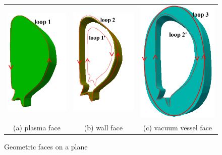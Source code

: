 \documentclass[11pt]{article}  %
\begin{document}
\begin{figure}
\center
\begin{tabular}{ccc}
\includegraphics[scale=0.3]{fig/plasmaGeoRegion.png}&
\includegraphics[scale=0.3]{fig/wallGeoRegion.png}&
\includegraphics[scale=0.3]{fig/vacuumGeoRegion.png}\\
\small{(a) plasma face}&\small{(b) wall face}&\small{(c) vacuum vessel face}\\
\end{tabular}
\caption{\small{Geometric faces on a plane}} 
\label{fig:facetopo}
\end{figure}
\end{document}
